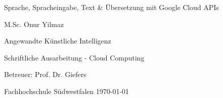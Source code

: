 \documentclass[12pt,a4paper]{article}
\begin{document}
	
		
		\begin{titlepage}
			\begin{center}
				\vspace*{1cm}
				\Huge
				Sprache, Spracheingabe, Text \& Übersetzung mit Google Cloud APIs
				
				
				\vspace{1.5cm}
				\LARGE
				M.Sc. Onur Yilmaz
				
				\vspace{1.5cm}
				\Large
				Angewandte Künstliche Intelligenz
				
				\vfill
				
				Schriftliche Ausarbeitung - Cloud Computing
				
				\vspace{0.8cm}
				\Large
				Betreuer: Prof. Dr. Giefers
				
				\vspace{0.5cm}
				\large
				Fachhochschule Südwestfalen
				\today
			\end{center}
		\end{titlepage}

\thispagestyle{empty}
\tableofcontents

\newpage
\end{document}
